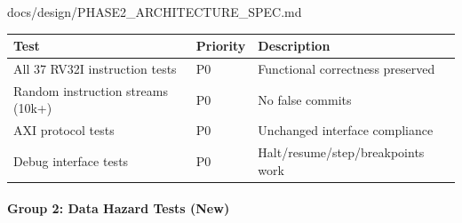 \begin{relocated}{docs/design/PHASE2_ARCHITECTURE_SPEC.md}
{
\begin{longtable}[]{@{}
  >{\raggedright\arraybackslash}p{}
  >{\raggedright\arraybackslash}p{}
  >{\raggedright\arraybackslash}p{}@{}}
\toprule\noalign{}
\begin{minipage}[b]{\linewidth}\raggedright
Test
\end{minipage} & \begin{minipage}[b]{\linewidth}\raggedright
Priority
\end{minipage} & \begin{minipage}[b]{\linewidth}\raggedright
Description
\end{minipage} \\
\midrule\noalign{}
\endhead
\bottomrule\noalign{}
\endlastfoot
All 37 RV32I instruction tests & P0 & Functional correctness
preserved \\
Random instruction streams (10k+) & P0 & No false commits \\
AXI protocol tests & P0 & Unchanged interface compliance \\
Debug interface tests & P0 &
Halt/\allowbreak{}resume/\allowbreak{}step/\allowbreak{}breakpoints
work \\
\end{longtable}
}

\paragraph{Group 2: Data Hazard Tests (New)}\label{ds:ch:phase2-architecture:group-2-data-hazard-tests-new}


\end{relocated}
